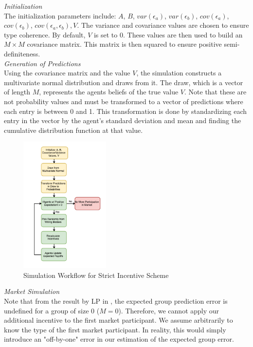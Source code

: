\documentclass[twoside,twocolumn]{article}
\begin{document}
\textit{Initialization}\\

The initialization parameters include: $A$, $B$, $var(\epsilon_a)$, $var(\epsilon_b)$, $cov(\epsilon_a)$, $cov(\epsilon_b)$, $cov(\epsilon_a, \epsilon_b), V$. The variance and covariance values are chosen to ensure type coherence. By default, $V$ is set to 0. These values are then used to build an $M \times M$ covariance matrix. This matrix is then squared to ensure positive semi-definiteness.\\

\textit{Generation of Predictions}\\

Using the covariance matrix and the value $V$, the simulation constructs a multivariate normal distribution and draws from it. The draw, which is a vector of length $M$, represents the agents beliefs of the true value $V$. Note that these are not probability values and must be transformed to a vector of predictions where each entry is between 0 and 1. This transformation is done by standardizing each entry in the vector by the agent's standard deviation and mean and finding the cumulative distribution function at that value.

\begin{figure}[h]
\centering
\includegraphics[width=0.4\textwidth]{flow1}
\caption{Simulation Workflow for Strict Incentive Scheme}
\end{figure}

\textit{Market Simulation}\\

Note that from the result by LP in \cite{3}, the expected group prediction error is undefined for a group of size 0 ($M = 0$). Therefore, we cannot apply our additional incentive to the first market participant. We assume arbitrarily to know the type of the first market participant. In reality, this would simply introduce an "off-by-one" error in our estimation of the expected group error.\\
\end{document}
